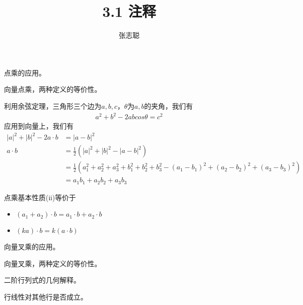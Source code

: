 \documentclass{article}
\begin{document}
\title{3.1 注释}
\author{张志聪}
\maketitle

\begin{zremark}
  点乘的应用。
\end{zremark}

\begin{zremark}
  向量点乘，两种定义的等价性。
\end{zremark}

利用余弦定理，三角形三个边为$a, b, c$，$\theta$为$a, b$的夹角，我们有
\begin{align*}
  a^2 + b^2 - 2 ab cos \theta = c^2
\end{align*}
应用到向量上，我们有
\begin{align*}
  |a|^2 + |b|^2 - 2a \cdot b & = |a - b|^2                                                                                                  \\
  a \cdot b                  & = \frac{1}{2}(|a|^2 + |b|^2 - |a - b|^2)                                                                     \\
                             & = \frac{1}{2}(a_1^2 + a_2^2 + a_3^2 + b_1^2 + b_2^2 + b_3^2 - (a_1 - b_1)^2 + (a_2 - b_2)^2 + (a_3 - b_3)^2) \\
                             & = a_1 b_1 + a_2 b_2 + a_3 b_3
\end{align*}

\begin{zremark}
  点乘基本性质(ii)等价于
  \begin{itemize}
    \item $(a_1 + a_2) \cdot b = a_1 \cdot b + a_2 \cdot b$
    \item $(ka) \cdot b = k (a \cdot b)$
  \end{itemize}
\end{zremark}

\begin{zremark}
  向量叉乘的应用。
\end{zremark}

\begin{zremark}
  向量叉乘，两种定义的等价性。
\end{zremark}

\begin{zremark}
  二阶行列式的几何解释。
\end{zremark}

\begin{zremark}
  行线性对其他行是否成立。
\end{zremark}
\end{document}
